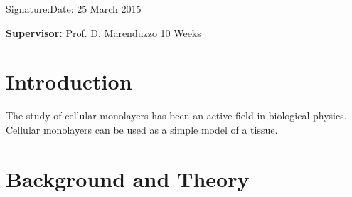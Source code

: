\documentclass[a4paper,12pt]{article}
\begin{document}
\vspace*{2cm}
Signature:\hspace*{8cm}Date: 25 March 2015

\vfill
{\bf Supervisor:} Prof. D. Marenduzzo                 %
\hfill
10 Weeks                                         %
\newpage
%
\pagestyle{plain}                               %
\setcounter{page}{1}                            %
\tableofcontents                                %

\break
\section{Introduction}
The study of cellular monolayers has been an active field in biological physics. Cellular monolayers can be used as a simple model of a tissue. 

%

\pagebreak
\section{Background and Theory}

%
%
\end{document}

